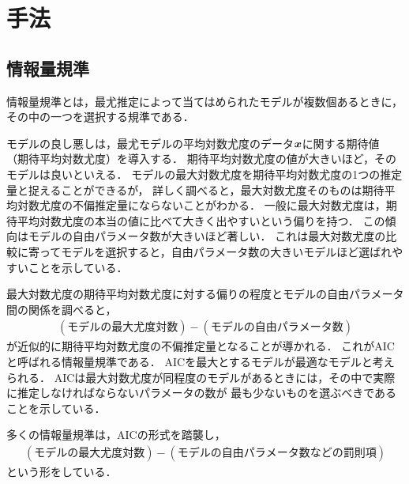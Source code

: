 \section{手法}

\subsection{情報量規準}
情報量規準とは，最尤推定によって当てはめられたモデルが複数個あるときに，その中の一つを選択する規準である．

モデルの良し悪しは，最尤モデルの平均対数尤度のデータ$\boldsymbol{x}$に関する期待値
（期待平均対数尤度）を導入する．
期待平均対数尤度の値が大きいほど，そのモデルは良いといえる．
モデルの最大対数尤度を期待平均対数尤度の1つの推定量と捉えることができるが，
詳しく調べると，最大対数尤度そのものは期待平均対数尤度の不偏推定量にならないことがわかる．
一般に最大対数尤度は，期待平均対数尤度の本当の値に比べて大きく出やすいという偏りを持つ．
この傾向はモデルの自由パラメータ数が大きいほど著しい．
これは最大対数尤度の比較に寄ってモデルを選択すると，自由パラメータ数の大きいモデルほど選ばれやすいことを示している．

最大対数尤度の期待平均対数尤度に対する偏りの程度とモデルの自由パラメータ間の関係を調べると，
\begin{align*}
  (モデルの最大尤度対数) - (モデルの自由パラメータ数)
\end{align*}
が近似的に期待平均対数尤度の不偏推定量となることが導かれる．
これがAICと呼ばれる情報量規準である．
AICを最大とするモデルが最適なモデルと考えられる．
AICは最大対数尤度が同程度のモデルがあるときには，その中で実際に推定しなければならないパラメータの数が
最も少ないものを選ぶべきであることを示している．

多くの情報量規準は，AICの形式を踏襲し，
\begin{align*}
  (モデルの最大尤度対数) - (モデルの自由パラメータ数などの罰則項)
\end{align*}
という形をしている．

